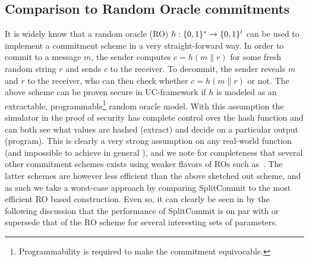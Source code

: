 \subsection{Comparison to Random Oracle commitments}
It is widely know that a random oracle (RO) $h:\{0,1\}^* \to \{0,1\}^l$ can be used to implement a commitment scheme in a very straight-forward way. In order to commit to a message $m$, the sender computes $c = h(m\|r)$ for some fresh random string $r$ and sends $c$ to the receiver. To decommit, the sender reveals $m$ and $r$ to the receiver, who can then check whether $c = h(m\|r)$ or not. The above scheme can be proven secure in UC-framework if $h$ is modeled as an extractable, programmable\footnote{Programmability is required to make the commitment equivocable.} random oracle model. With this assumption the simulator in the proof of security has complete control over the hash function and can both see what values are hashed (extract) and decide on a particular output (program). This is clearly a very strong assumption on any real-world function (and impossible to achieve in general \cite{DBLP:conf/stoc/CanettiGH98}), and we note for completeness that several other commitment schemes exists using weaker flavors of ROs such as~\cite{DBLP:conf/tcc/HofheinzM04,DBLP:conf/ccs/Canetti0S14}. The latter schemes are however less efficient than the above sketched out scheme, and as such we take a worst-case approach by comparing SplitCommit to the most efficient RO based construction. Even so, it can clearly be seen in by the following discussion that the performance of SplitCommit is on par with or supersede that of the RO scheme for several interesting sets of parameters.

